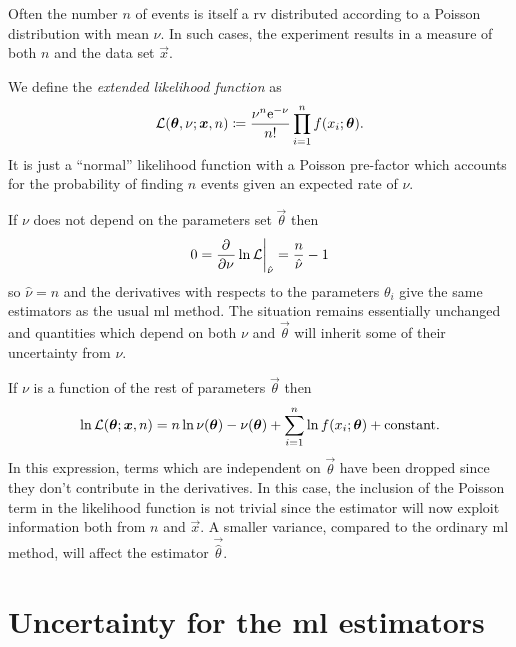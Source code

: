Often the number $n$ of events is itself a \ac{rv} distributed according to a Poisson distribution with mean $\nu$.
In such cases, the experiment results in a measure of both $n$ and the data set $\vec{x}$.


We define the \emph{extended likelihood function} as
\begin{equation}
	\mathcal{L}(\bm{{\theta}},\nu;\bm{{x}},n) \coloneqq \frac{\nu^n\mathrm{e}^{-\nu}}{n!}\prod_{i=1}^n f(x_i;\bm{{\theta}}).
\end{equation}
It is just a ``normal'' likelihood function with a Poisson pre-factor which accounts for the probability of finding $n$ events given an expected rate of $\nu$.


If $\nu$ does not depend on the parameters set $\vec{\theta}$ then
\begin{equation}
	0 = \dfrac{{\mathop{}\!\mathrm{\partial}^{}}}{\mathop{}\!\mathrm{\partial} \nu^{}}\ln\mathcal{L}\bigg\rvert_{\hat\nu} = \frac{n}{\hat\nu}-1
\end{equation}
so $\hat\nu = n$ and the derivatives with respects to the parameters $\theta_i$ give the same estimators as the usual \ac{ml} method.
The situation remains essentially unchanged and quantities which depend on both $\nu$ and $\vec{\theta}$ will inherit some of their uncertainty from $\nu$.



If $\nu$ is a function of the rest of parameters $\vec{\theta}$ then
\begin{equation}
	\ln\mathcal{L}(\bm{{\theta}}; \bm{{x}}, n) = n \ln \nu(\bm{{\theta}}) - \nu (\bm{{\theta}})+
	\sum_{i=1} ^ n \ln f(x_i; \bm{{\theta}}) + \textup{constant}.
\end{equation}
In this expression, terms which are independent on $\vec{\theta}$ have been dropped since they don't contribute in the derivatives.
In this case, the inclusion of the Poisson term in the likelihood function is not trivial since the estimator \vec{\hat\theta} will now exploit information both from $n$ and $\vec{x}$.
A smaller variance, compared to the ordinary \ac{ml} method, will affect the estimator $\vec{\hat\theta}$.


\section{Uncertainty for the \acs{ml} estimators}

